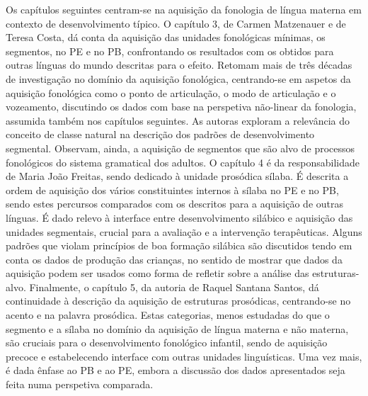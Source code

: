 Os capítulos seguintes centram-se na aquisição da fonologia de língua materna em contexto de desenvolvimento típico. O capítulo 3, de Carmen Matzenauer e de Teresa Costa, dá conta da aquisição das unidades fonológicas mínimas, os segmentos, no PE e no PB, confrontando os resultados com os obtidos para outras línguas do mundo descritas para o efeito. Retomam mais de três décadas de investigação no domínio da aquisição fonológica, centrando-se em aspetos da aquisição fonológica como o ponto de articulação, o modo de articulação e o vozeamento, discutindo os dados com base na perspetiva não-linear da fonologia, assumida também nos capítulos seguintes. As autoras exploram a relevância do conceito de classe natural na descrição dos padrões de desenvolvimento segmental. Observam, ainda, a aquisição de segmentos que são alvo de processos fonológicos do sistema gramatical dos adultos. O capítulo 4 é da responsabilidade de Maria João Freitas, sendo dedicado à unidade prosódica sílaba. É descrita a ordem de aquisição dos vários constituintes internos à sílaba no PE e no PB, sendo estes percursos comparados com os descritos para a aquisição de outras línguas. É dado relevo à interface entre desenvolvimento silábico e aquisição das unidades segmentais, crucial para a avaliação e a intervenção terapêuticas. Alguns padrões que violam princípios de boa formação silábica são discutidos tendo em conta os dados de produção das crianças, no sentido de mostrar que dados da aquisição podem ser usados como forma de refletir sobre a análise das estruturas-alvo. Finalmente, o capítulo 5, da autoria de Raquel Santana Santos, dá continuidade à descrição da aquisição de estruturas prosódicas, centrando-se no acento e na palavra prosódica. Estas categorias, menos estudadas do que o segmento e a sílaba no domínio da aquisição de língua materna e não materna, são cruciais para o desenvolvimento fonológico infantil, sendo de aquisição precoce e estabelecendo interface com outras unidades linguísticas. Uma vez mais, é dada ênfase ao PB e ao PE, embora a discussão dos dados apresentados seja feita numa perspetiva comparada. 


